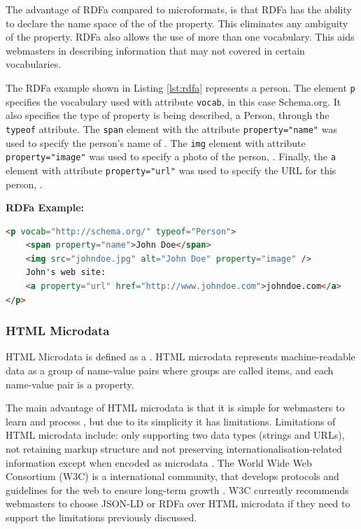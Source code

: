 \newpage
The advantage of RDFa compared to microformats, is that RDFa has the ability to declare the name space of the of the property. This eliminates any ambiguity of the property. RDFa also allows the use of more than one vocabulary. This aids webmasters in describing information that may not covered in certain vocabularies. 

The RDFa example shown in Listing \ref{lst:rdfa} represents a person. The element \texttt{p} specifies the vocabulary used with attribute \texttt{vocab}, in this case Schema.org. It also specifies the type of property is being described, a Person, through the \texttt{typeof} attribute. The \texttt{span} element with the attribute \texttt{property="name"} was used to specify the person's name of . The \texttt{img} element with attribute \texttt{property="image"} was used to specify a photo of the person, . Finally, the \texttt{a} element with attribute \texttt{property="url"} was used to specify the URL for this person, .\newline

\noindent
\textbf{RDFa Example:}
{
\begin{lstlisting}[language=HTML,caption={A RDFa Example},captionpos=b,label={lst:rdfa},showstringspaces=false]
<p vocab="http://schema.org/" typeof="Person">
    <span property="name">John Doe</span>
    <img src="johndoe.jpg" alt="John Doe" property="image" />
    John's web site: 
    <a property="url" href="http://www.johndoe.com">johndoe.com</a>
</p>
\end{lstlisting}
}

\subsubsection{HTML Microdata}
HTML Microdata is defined as a  \cite{htmlMicrodata2018}. HTML microdata represents machine-readable data as a group of name-value pairs \cite{sikos2015mastering} where groups are called items, and each name-value pair is a property. 

The main advantage of HTML microdata is that it is simple for webmasters to learn and process \cite{htmlMicrodata2018}, but due to its simplicity it has limitations. Limitations of HTML microdata include: only supporting two data types (strings and URLs), not retaining markup structure and not preserving internationalisation-related information except when encoded as microdata \cite{htmlMicrodata2018}. The World Wide Web Consortium (W3C) is a international community, that develops protocols and guidelines for the web to ensure long-term growth \cite{w3cFAQ}. W3C currently recommends webmasters to choose JSON-LD or RDFa over HTML microdata \cite{htmlMicrodata2018} if they need to support the limitations previously discussed. 


